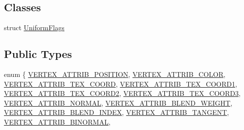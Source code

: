 \subsection*{Classes}
\begin{DoxyCompactItemize}
\item 
struct \hyperlink{structGLProgram_1_1UniformFlags}{Uniform\+Flags}
\end{DoxyCompactItemize}
\subsection*{Public Types}
\begin{DoxyCompactItemize}
\item 
enum \{ \newline
\hyperlink{classGLProgram_aafc660d342bb6478b32651459efb4189aa1225466c53c782a2e00617ec99a87f8}{V\+E\+R\+T\+E\+X\+\_\+\+A\+T\+T\+R\+I\+B\+\_\+\+P\+O\+S\+I\+T\+I\+ON}, 
\hyperlink{classGLProgram_aafc660d342bb6478b32651459efb4189a50b3518a577a53b81bef44eb369981f1}{V\+E\+R\+T\+E\+X\+\_\+\+A\+T\+T\+R\+I\+B\+\_\+\+C\+O\+L\+OR}, 
\hyperlink{classGLProgram_aafc660d342bb6478b32651459efb4189a7839de6e081a92fc2dc14cc6cc60b013}{V\+E\+R\+T\+E\+X\+\_\+\+A\+T\+T\+R\+I\+B\+\_\+\+T\+E\+X\+\_\+\+C\+O\+O\+RD}, 
\hyperlink{classGLProgram_aafc660d342bb6478b32651459efb4189ae601c0a83eda945a5ef1530bbd10c433}{V\+E\+R\+T\+E\+X\+\_\+\+A\+T\+T\+R\+I\+B\+\_\+\+T\+E\+X\+\_\+\+C\+O\+O\+R\+D1}, 
\newline
\hyperlink{classGLProgram_aafc660d342bb6478b32651459efb4189a1a8fe07efc26d9014312db795368f383}{V\+E\+R\+T\+E\+X\+\_\+\+A\+T\+T\+R\+I\+B\+\_\+\+T\+E\+X\+\_\+\+C\+O\+O\+R\+D2}, 
\hyperlink{classGLProgram_aafc660d342bb6478b32651459efb4189aefb74d9a7d69704eff1283116ca5ed38}{V\+E\+R\+T\+E\+X\+\_\+\+A\+T\+T\+R\+I\+B\+\_\+\+T\+E\+X\+\_\+\+C\+O\+O\+R\+D3}, 
\hyperlink{classGLProgram_aafc660d342bb6478b32651459efb4189aae20efe610a33441d38d32b4d2fa031f}{V\+E\+R\+T\+E\+X\+\_\+\+A\+T\+T\+R\+I\+B\+\_\+\+N\+O\+R\+M\+AL}, 
\hyperlink{classGLProgram_aafc660d342bb6478b32651459efb4189ae59688f7855e6073b9c1427bd1db25ef}{V\+E\+R\+T\+E\+X\+\_\+\+A\+T\+T\+R\+I\+B\+\_\+\+B\+L\+E\+N\+D\+\_\+\+W\+E\+I\+G\+HT}, 
\newline
\hyperlink{classGLProgram_aafc660d342bb6478b32651459efb4189a367001fd3be1741740cf90bbbee4efdb}{V\+E\+R\+T\+E\+X\+\_\+\+A\+T\+T\+R\+I\+B\+\_\+\+B\+L\+E\+N\+D\+\_\+\+I\+N\+D\+EX}, 
\hyperlink{classGLProgram_aafc660d342bb6478b32651459efb4189ac30fbcace1a48141e056e4c815cd5fa5}{V\+E\+R\+T\+E\+X\+\_\+\+A\+T\+T\+R\+I\+B\+\_\+\+T\+A\+N\+G\+E\+NT}, 
\hyperlink{classGLProgram_aafc660d342bb6478b32651459efb4189a25146f857e4c09095ec5ffa4b1e4c445}{V\+E\+R\+T\+E\+X\+\_\+\+A\+T\+T\+R\+I\+B\+\_\+\+B\+I\+N\+O\+R\+M\+AL}, 

\end{DoxyCompactItemize}
